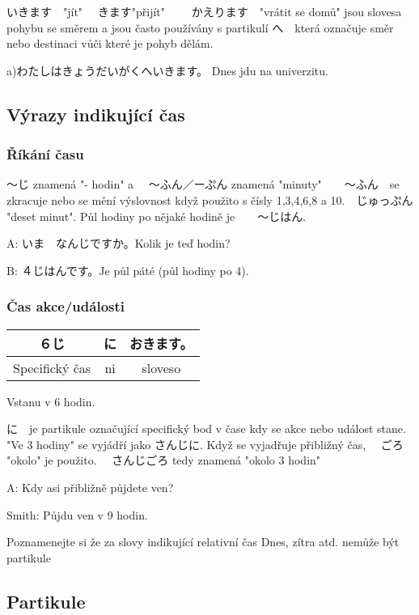 いきます　"jít" 　きます"přijít" 　　かえります　"vrátit se domů" jsou slovesa pohybu se směrem a jsou často používány s partikulí へ　která označuje směr nebo destinaci vůči které je pohyb dělám.

a)わたしはきょうだいがくへいきます。 Dnes jdu na univerzitu.



\subsection{Výrazy indikující čas}

\subsubsection{Říkání času}

〜じ znamená "- hodin" a 　〜ふん／ーぷん znamená "minuty"　　〜ふん　se zkracuje nebo se mění výslovnost když použito s čísly 1,3,4,6,8 a 10.　じゅっぷん "deset minut". Půl hodiny po nějaké hodině je　　〜じはん.

A: いま　なんじですか。Kolik je teď hodin?

B: ４じはんです。Je půl páté (půl hodiny po 4).


\subsubsection{Čas akce/události}
\begin{center}
\begin{tabular}{||c|c||c||}
\hline
６じ&に&おきます。\\
\hline
Specifický čas&ni&sloveso\\
\hline
\end{tabular}
\end{center}
Vstanu v 6 hodin.

に　je partikule označující specifický bod v čase kdy se akce nebo událost stane. "Ve 3 hodiny" se vyjádří jako さんじに. Když se vyjadřuje přibližný čas, 　ごろ "okolo" je použito. 　さんじごろ tedy znamená "okolo 3 hodin"


A: Kdy asi přibližně půjdete ven?

Smith: Půjdu ven v 9 hodin.

Poznamenejte si že za slovy indikující relativní čas Dnes, zítra atd. nemůže být partikule

\subsection{Partikule}

